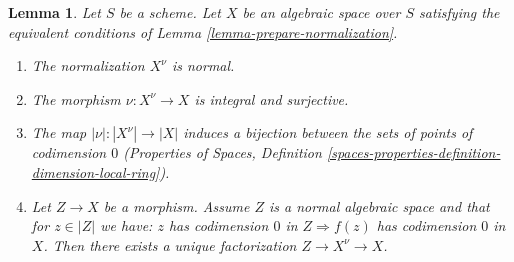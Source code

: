 \documentclass{stacks-project}
\theoremstyle{plain}
\newtheorem{lemma}[subsection]{Lemma}
\theoremstyle{definition}
\theoremstyle{remark}
\numberwithin{equation}{subsection}
\begin{document}
\begin{lemma}
\label{lemma-normalization-normal}
Let $S$ be a scheme. Let $X$ be an algebraic space over $S$ satisfying the
equivalent conditions of Lemma \ref{lemma-prepare-normalization}.
\begin{enumerate}
\item The normalization $X^\nu$ is normal.
\item The morphism $\nu : X^\nu \to X$ is integral and surjective.
\item The map $|\nu| : |X^\nu| \to |X|$ induces a bijection between
the sets of points of codimension $0$ (Properties of Spaces,
Definition \ref{spaces-properties-definition-dimension-local-ring}).
\item Let $Z \to X$ be a morphism. Assume $Z$ is a normal algebraic space
and that for $z \in |Z|$ we have: $z$ has codimension $0$ in
$Z \Rightarrow f(z)$ has codimension $0$ in $X$. Then
there exists a unique factorization $Z \to X^\nu \to X$.
\end{enumerate}
\end{lemma}
\end{document}
